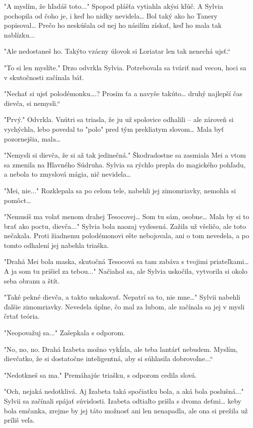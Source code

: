 \documentclass{book}
\begin{document}
"$ $A myslím, že hľadáš toto..."$ $ Spopod plášťa vytiahla akýsi kľúč. A Sylvia pochopila od čoho je, i keď ho nidky nevidela… Bol taký ako ho Tanery popisoval… Prečo ho neskúšala od nej ho násilím získať, keď ho mala tak nablízku...

"$ $Ale nedostaneš ho. Takýto vzácny úlovok si Loriatar len tak nenechá ujsť.“

"$ $To si len myslíte."$ $ Drzo odvrkla Sylvia. Potrebovala sa tváriť nad vecou, hoci sa v skutočnosti začínala báť.

"$ $Nechať si ujsť polodémonku….? Prosím ťa a navyše takúto… druhý najlepší čas dievča, si nemysli.“

"$ $Prvý."$ $ Odvrkla. Vnútri sa triasla, že ju už spolovice odhalili – ale zároveň si vychýchla, lebo povedal to "$ $polo"$ $ pred tým prekliatym slovom… Mala byť pozornejšia, mala…

"$ $Nemysli si dievča, že si až tak jedinečná."$ $ Škodradostne sa zasmiala Mei a vtom sa zmenila na Hlavného Súdruha. Sylvia sa rýchlo prepla do magického pohľadu, a nebola to zmyslová mágia, nič nevidela…

"$ $Mei, nie..."$ $ Rozklepala sa po celom tele, nabehli jej zimomriavky, nemohla si pomôct…

 "$ $Nemusíš ma volať menom drahej Tesocovej… Som tu sám, osobne… Mala by si to brať ako poctu, dievča..."$ $ Sylvia bola naozaj vydesená. Zažila už všeličo, ale toto nečakala. Proti žiadnemu polodémonovi ešte nebojovala, ani o tom nevedela, a po tomto odhalení jej nabehla triaška.

"$ $Drahá Mei bola maska, skutočná Tesocová sa tam zabáva s tvojimi priateľkami… A ja som tu prišiel za tebou..."$ $ Načiahol sa, ale Sylvia uskočila, vytvorila si okolo seba obranu a štít.

"$ $Také pekné dievča, a takto uskakovať. Nepatrí sa to, nie mne…"$ $ Sylvii nabehli ďalšie zimomriavky. Nevedela úplne, čo mal za lubom, ale začínala sa jej v mysli črtať teória.

"$ $Neopovažuj sa..."$ $ Zašepkala s odporom.

"$ $No, no, no. Drahá Izabeta možno vykĺzla, ale teba lantárť nebudem. Myslím, dievčatko, že si dostatočne inteligentná, aby si súhlasila dobrovoľne...“

"$ $Nedotkneš sa ma."$ $ Premáhajúc triašku, s odporom cedila slová.

"$ $Och, nejaká nedotklivá. Aj Izabeta taká spočiatku bola, a aká bola poslušná..."$ $ Sylvii sa začínali spájať súvislosti. Izabeta odtiaľto prišla s dvoma deťmi… keby bola emčanka, zrejme by jej táto možnosť ani len nenapadla, ale ona si prežila už príliš veľa.
\end{document}
